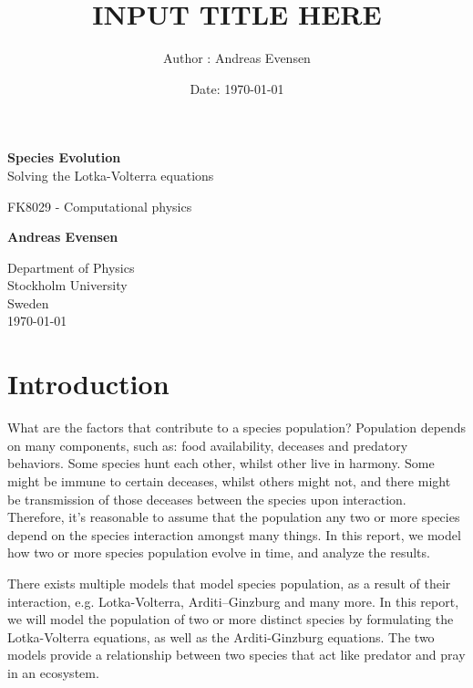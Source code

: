 \documentclass[a4paper]{article}
\title{INPUT TITLE HERE}
\author{Author : Andreas Evensen}
\date{Date: \today}
\newcommand{\newparagraph}{\vspace{.5cm}\noindent}
\begin{document}
\begin{titlepage}
    \begin{center}
        \vspace*{1cm}

        \Huge
        \textbf{Species Evolution}\\
        \LARGE
        Solving the Lotka-Volterra equations
        

        \vspace{1.5cm}
        \LARGE
        FK8029 - Computational physics

        \vspace{1.5cm}

        \textbf{Andreas Evensen}

        \vfill


        \Large
        Department of Physics\\
        Stockholm University\\
        Sweden\\
        \today
    \end{center}
\end{titlepage}


\section{Introduction}
What are the factors that contribute to a species population? Population depends on many components, such as: food availability, deceases and predatory behaviors. Some species hunt each other, whilst other live in harmony. Some might be immune to certain deceases, whilst others might not, and there might be transmission of those deceases between the species upon interaction. Therefore, it's reasonable to assume that the population any two or more species depend on the species interaction amongst many things. In this report, we model how two or more species population evolve in time, and analyze the results.

\newparagraph
There exists multiple models that model species population, as a result of their interaction, e.g. Lotka-Volterra, Arditi–Ginzburg and many more. In this report, we will model the population of two or more distinct species by formulating the Lotka-Volterra equations, as well as the Arditi-Ginzburg equations. The two models provide a relationship between two species that act like predator and pray in an ecosystem.
\newpage
\end{document}
